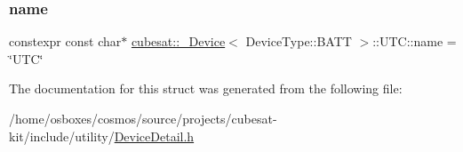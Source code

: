 \subsubsection{\texorpdfstring{name}{name}}
{\footnotesize\ttfamily constexpr const char$\ast$ \hyperlink{structcubesat_1_1__Device}{cubesat\+::\+\_\+\+Device}$<$ Device\+Type\+::\+B\+A\+TT $>$\+::U\+T\+C\+::name = \char`\"{}U\+TC\char`\"{}\hspace{0.3cm}{\ttfamily [static]}}



The documentation for this struct was generated from the following file\+:\begin{DoxyCompactItemize}
\item 
/home/osboxes/cosmos/source/projects/cubesat-\/kit/include/utility/\hyperlink{DeviceDetail_8h}{Device\+Detail.\+h}\end{DoxyCompactItemize}

